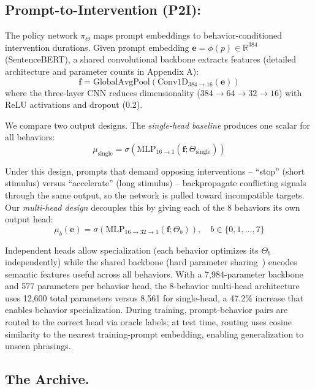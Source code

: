 \documentclass{article}
\begin{document}
\subsection{Prompt-to-Intervention (P2I):}
\label{p2i}

The policy network $\pi_\Theta$ maps prompt embeddings to behavior-conditioned intervention durations. Given prompt embedding $\mathbf{e} = \phi(p) \in \mathbb{R}^{384}$ (SentenceBERT), a shared convolutional backbone extracts features (detailed architecture and parameter counts in Appendix A):
\begin{equation}
\mathbf{f} = \text{GlobalAvgPool}(\text{Conv1D}_{384 \to 16}(\mathbf{e}))
\end{equation}
where the three-layer CNN reduces dimensionality ($384 \to 64 \to 32 \to 16$) with ReLU activations and dropout (0.2).

We compare two output designs. The \textit{single-head baseline} produces one scalar for all behaviors:
\begin{equation}
\mu_{\text{single}} = \sigma(\text{MLP}_{16 \to 1}(\mathbf{f}; \Theta_{\text{single}}))
\end{equation}

Under this design, prompts that demand opposing interventions -- ``stop'' (short stimulus) versus ``accelerate'' (long stimulus) -- backpropagate conflicting signals through the same output, so the network is pulled toward incompatible targets. Our \textit{multi-head design} decouples this by giving each of the 8 behaviors its own output head:
\begin{equation}
\mu_b(\mathbf{e}) = \sigma(\text{MLP}_{16 \to 32 \to 1}(\mathbf{f}; \Theta_b)), \quad b \in \{0, 1, \ldots, 7\}
\end{equation}

Independent heads allow specialization (each behavior optimizes its $\Theta_b$ independently) while the shared backbone (hard parameter sharing~\cite{ruder2017overview}) encodes semantic features useful across all behaviors. With a 7,984-parameter backbone and 577 parameters per behavior head, the 8-behavior multi-head architecture uses 12,600 total parameters versus 8,561 for single-head, a 47.2\% increase that enables behavior specialization. During training, prompt-behavior pairs are routed to the correct head via oracle labels; at test time, routing uses cosine similarity to the nearest training-prompt embedding, enabling generalization to unseen phrasings.

\subsection{The Archive.}
\label{archive}
\end{document}
